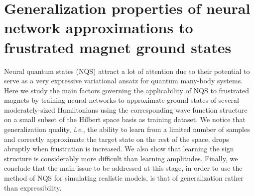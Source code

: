\cleartoverso
\thispagestyle{empty}%
\BgThisPage
\clearpage
\chapter[Generalization properties of neural network approximations to frustrated magnet ground states][Generalization properties of NQS]{Generalization properties of neural network approximations to frustrated magnet ground states}\label{ch:nc20}
\BgThisPage

{\small Neural quantum states (NQS) attract a lot of attention due to their potential to serve as a very expressive variational ansatz for quantum many-body systems. Here we study the main factors governing the applicability of NQS to frustrated magnets by training neural networks to approximate ground states of several moderately-sized Hamiltonians using the corresponding wave function structure on a small subset of the Hilbert space basis as training dataset. We notice that generalization quality, \textit{i.e.}, the ability to learn from a limited number of samples and correctly approximate the target state on the rest of the space, drops abruptly when frustration is increased. We also show that learning the sign structure is considerably more difficult than learning amplitudes. Finally, we conclude that the main issue to be addressed at this stage, in order to use the method of NQS for simulating realistic models, is that of generalization rather than expressibility.}

\clearpage



